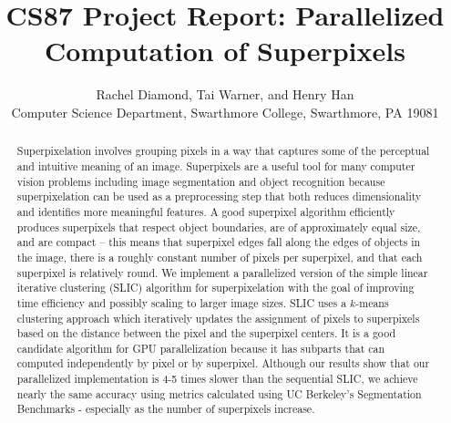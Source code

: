 \documentclass[11pt,twocolumn]{article}
\begin{document}
\title{CS87 Project Report: Parallelized Computation of Superpixels}

\author{Rachel Diamond, Tai Warner, and Henry Han \\
Computer Science Department, Swarthmore College, Swarthmore, PA  19081}

\maketitle

\begin{abstract}




Superpixelation involves grouping pixels in a way that captures some of the perceptual and intuitive meaning of an image. Superpixels are a useful tool for many computer vision problems including image segmentation and object recognition because superpixelation can be used as a preprocessing step that both reduces dimensionality and identifies more meaningful features. A good superpixel algorithm efficiently produces superpixels that respect object boundaries, are of approximately equal size, and are compact -- this means that superpixel edges fall along the edges of objects in the image, there is a roughly constant number of pixels per superpixel, and that each superpixel is relatively round. We implement a parallelized version of the simple linear iterative clustering (SLIC) algorithm for superpixelation with the goal of improving time efficiency and possibly scaling to larger image sizes. SLIC uses a $k$-means clustering approach which iteratively updates the assignment of pixels to superpixels based on the distance between the pixel and the superpixel centers. It is a good candidate algorithm for GPU parallelization because it has subparts that can computed independently by pixel or by superpixel. Although our results show that our parallelized implementation is 4-5 times slower than the sequential SLIC, we achieve nearly the same accuracy using metrics calculated using UC Berkeley's Segmentation Benchmarks - especially as the number of superpixels increase. 

\end{abstract}
\end{document}
